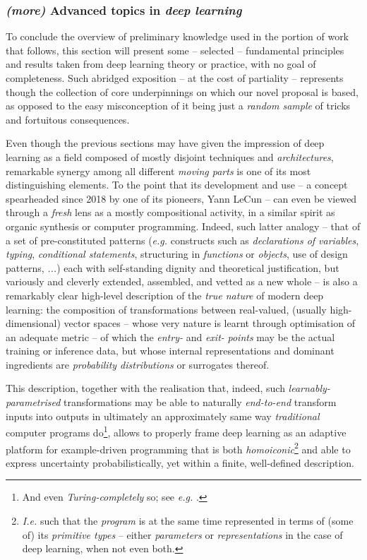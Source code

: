 \subsubsection{\textit{(more)} Advanced topics in \textit{deep learning}}

To conclude the overview of preliminary knowledge used in the portion of work that follows, this section will present some -- selected -- fundamental principles and results taken from deep learning theory or practice, with no goal of completeness. Such abridged exposition -- at the cost of partiality -- represents though the collection of core underpinnings on which our novel proposal is based, as opposed to the easy misconception of it being just a \textit{random sample} of tricks and fortuitous consequences.

Even though the previous sections may have given the impression of deep learning as a field composed of mostly disjoint techniques and \textit{architectures}, remarkable synergy among all different \textit{moving parts} is one of its most distinguishing elements. To the point that its development and use -- a concept spearheaded since 2018 by one of its pioneers, Yann LeCun -- can even be viewed through a \textit{fresh} lens as a mostly compositional activity, in a similar spirit as organic synthesis or computer programming. Indeed, such latter analogy -- that of a set of pre-constituted patterns (\textit{e.g.} constructs such as \textit{declarations of variables}, \textit{typing}, \textit{conditional statements}, structuring in \textit{functions} or \textit{objects}, use of design patterns, \textit{...}) each with self-standing dignity and theoretical justification, but variously and cleverly extended, assembled, and vetted as a new whole -- is also a remarkably clear high-level description of the \textit{true nature} of modern deep learning: the composition of transformations between real-valued, (usually high-dimensional) vector spaces -- whose very nature is learnt through optimisation of an adequate metric -- of which the \textit{entry-} and \textit{exit-} \textit{points} may be the actual training or inference data, but whose internal representations and dominant ingredients are \textit{probability distributions} or surrogates thereof.

This description, together with the realisation that, indeed, such \textit{learnably-parametrised} transformations may be able to naturally \textit{end-to-end} transform  inputs into outputs in ultimately an approximately same way \textit{traditional} computer programs do\footnote{And even \textit{Turing-completely} so; see \textit{e.g.} \cite{PerezEtAl2018Turing}.}, allows to properly frame deep learning as an adaptive platform for example-driven programming that is both \textit{homoiconic}\footnote{\textit{I.e.} such that the \textit{program} is at the same time represented in terms of (some of) its \textit{primitive types} -- either \textit{parameters} or \textit{representations} in the case of deep learning, when not even both.} and able to express uncertainty probabilistically, yet within a finite, well-defined description.

